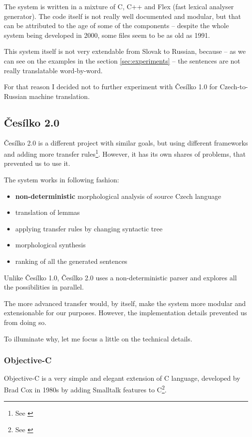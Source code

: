 The system is written in a mixture of C, C++ and Flex (fast lexical analyser generator). The code itself is not really well documented and modular, but that can be attributed to the age of some of the components -- despite the whole system being developed in 2000, some files seem to be as old as 1991.

This system itself is not very extendable from Slovak to Russian, because -- as we can see on the examples in the section \ref{sec:experiments} -- the sentences are not really translatable word-by-word.

For that reason I decided not to further experiment with Česílko 1.0 for Czech-to-Russian machine translation.

\subsection{Česílko 2.0}
Česílko 2.0 is a different project with similar goals, but using different frameworks and adding more transfer rules\footnote{See \cite{cesilko2}}. However, it has its own shares of problems, that prevented us to use it.

The system works in following fashion:
\begin{itemize}
\item \textbf{non-deterministic} morphological analysis of source Czech language
\item translation of lemmas
\item applying transfer rules by changing syntactic tree
\item morphological synthesis
\item ranking of all the generated sentences
\end{itemize}

Unlike Česílko 1.0, Česílko 2.0 uses a non-deterministic parser and explores all the possibilities in parallel. 

The more advanced transfer would, by itself, make the system more modular and extensionable for our purposes. However, the implementation details prevented us from doing so.

To illuminate why, let me focus a little on the technical details.

\subsubsection{Objective-C}
Objective-C is a very simple and elegant extension of C language, developed by Brad Cox in 1980s by adding Smalltalk features to C\footnote{See \cite{cocoa4}}. 

